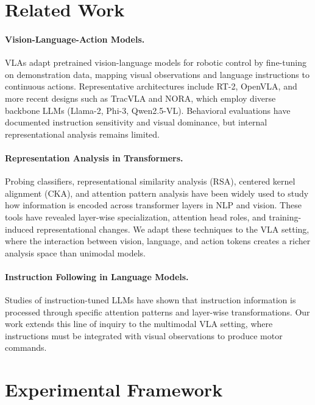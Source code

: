 \documentclass[10pt,letterpaper]{article}
\begin{document}
\section{Related Work}
\label{sec:related}

\paragraph{Vision-Language-Action Models.}
VLAs adapt pretrained vision-language models for robotic control by fine-tuning on demonstration data, mapping visual observations and language instructions to continuous actions. Representative architectures include RT-2, OpenVLA, and more recent designs such as TracVLA and NORA, which employ diverse backbone LLMs (Llama-2, Phi-3, Qwen2.5-VL). Behavioral evaluations have documented instruction sensitivity and visual dominance, but internal representational analysis remains limited.

\paragraph{Representation Analysis in Transformers.}
Probing classifiers, representational similarity analysis (RSA), centered kernel alignment (CKA), and attention pattern analysis have been widely used to study how information is encoded across transformer layers in NLP and vision. These tools have revealed layer-wise specialization, attention head roles, and training-induced representational changes. We adapt these techniques to the VLA setting, where the interaction between vision, language, and action tokens creates a richer analysis space than unimodal models.

\paragraph{Instruction Following in Language Models.}
Studies of instruction-tuned LLMs have shown that instruction information is processed through specific attention patterns and layer-wise transformations. Our work extends this line of inquiry to the multimodal VLA setting, where instructions must be integrated with visual observations to produce motor commands.

\section{Experimental Framework}
\label{sec:method}
\end{document}
